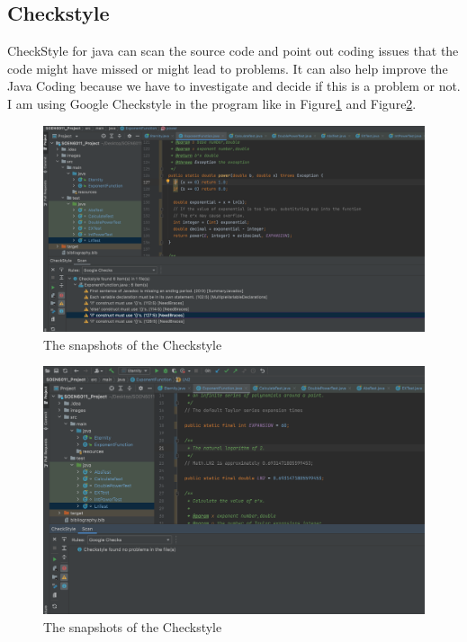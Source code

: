 \documentclass[11pt]{article}
\begin{document}
\subsection{Checkstyle}
CheckStyle for java can scan the source code and point out coding issues that the code might have missed or might lead to problems.
It can also help improve the Java Coding because we have to investigate and decide if this is a problem or not. I am using Google Checkstyle in the program like in Figure\ref{fig:Checkstyle} and Figure\ref{fig:Checkstyle2}.
\begin{figure}[p]
    \centering
    \includegraphics[width=15cm]{images/checkstyle.png}
    \caption{The snapshots of the Checkstyle}
    \label{fig:Checkstyle}
\end{figure}

\begin{figure}[p]
    \centering
    \includegraphics[width=15cm]{images/check2.png}
    \caption{The snapshots of the Checkstyle}
    \label{fig:Checkstyle2}
\end{figure}
\end{document}

